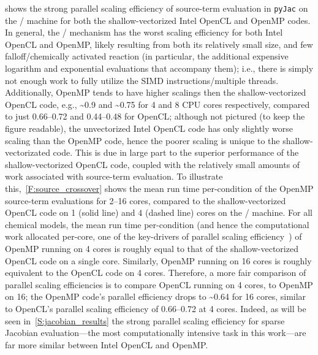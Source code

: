 \documentclass[12pt,number,sort&compress,preprint]{elsarticle}
\begin{document}
 shows the strong parallel scaling efficiency of source-term evaluation in \texttt{pyJac} on the \avx/ machine for both the shallow-vectorized Intel OpenCL and OpenMP codes.
In general, the \slash{} mechanism has the worst scaling efficiency for both Intel OpenCL and OpenMP, likely resulting from both its relatively small size, and few falloff\slash chemically activated reaction (in particular, the additional expensive logarithm and exponential evaluations that accompany them); i.e., there is simply not enough work to fully utilize the SIMD instructions\slash multiple threads.
Additionally, OpenMP tends to have higher scalings then the shallow-vectorized OpenCL code, e.g., \textasciitilde\num{0.9} and \textasciitilde\num{0.75} for \num{4} and \num{8} CPU cores respectively, compared to just \numrange{0.66}{0.72} and \numrange{0.44}{0.48} for OpenCL; although not pictured (to keep the figure readable), the unvectorized Intel OpenCL code has only slightly worse scaling than the OpenMP code, hence the poorer scaling is unique to the shallow-vectorizated code.
This is due in large part to the superior performance of the shallow-vectorized OpenCL code, coupled with the relatively small amounts of work associated with source-term evaluation.
To illustrate this,~\cref{F:source_crossover} shows the mean run time per-condition of the OpenMP source-term evaluations for \numrange{2}{16} cores, compared to the shallow-vectorized OpenCL code on \num{1} (solid line) and \num{4} (dashed line) cores on the \avx/ machine.
For all chemical models, the mean run time per-condition (and hence the computational work allocated per-core, one of the key-drivers of parallel scaling efficiency~\cite{strong_scaling}) of OpenMP running on \num{4} cores is roughly equal to that of the shallow-vectorized OpenCL code on a single core.
Similarly, OpenMP running on \num{16} cores is roughly equivalent to the OpenCL code on \num{4} cores.
Therefore, a more fair comparison of parallel scaling efficiencies is to compare OpenCL running on \num{4} cores, to OpenMP on \num{16}; the OpenMP code's parallel efficiency drops to \textasciitilde\num{0.64} for \num{16} cores, similar to OpenCL's parallel scaling efficiency of \numrange{0.66}{0.72} at \num{4} cores.
Indeed, as will be seen in~\cref{S:jacobian_results} the strong parallel scaling efficiency for sparse Jacobian evaluation---the most computationally intensive task in this work---are far more similar between Intel OpenCL and OpenMP.
\end{document}
